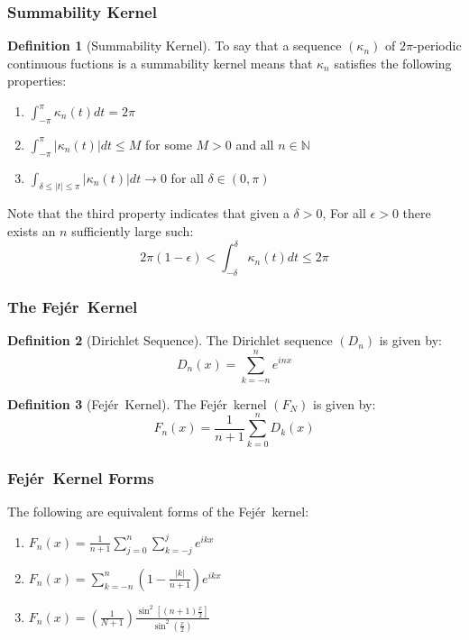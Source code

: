 \documentclass[xcolor=dvipsnames]{beamer}
\theoremstyle{definition}
\newtheorem*{defn}{Definition}
\newcommand{\N}{\mathbb{N}}
\providecommand{\abs}[1]{\left\lvert#1\right\rvert}        %
\newcommand{\Fej}{Fej\'{e}r\ }
\renewcommand{\d}{\delta}
\newcommand{\e}{\epsilon}
\renewcommand{\k}{\kappa}
\begin{document}
\begin{frame}
  \frametitle{Summability Kernel}

  \begin{defn}[Summability Kernel]
    To say that a sequence $(\k_n)$ of $2\pi$-periodic continuous fuctions is
      a summability kernel means that $\k_n$ satisfies the following properties:
      \begin{enumerate}
      \item $\int_{-\pi}^{\pi}\k_n(t)dt=2\pi$
      \item $\int_{-\pi}^{\pi}\abs{\k_n(t)}dt\le M$ for some $M>0$ and all
          $n\in\N$
      \item $\int_{\d\le\abs{t}\le\pi}\abs{\k_n(t)}dt\to0$ for all $\d\in(0,\pi)$
    \end{enumerate}
  \end{defn}

  Note that the third property indicates that given a $\d>0$, For all $\e>0$
  there exists an $n$ sufficiently large such:
  \[2\pi(1-\e)<\int_{-\d}^{\d}\k_n(t)dt\le2\pi\]
  
\end{frame}

\begin{frame}
  \frametitle{The \Fej Kernel}
  
  \begin{defn}[Dirichlet Sequence]
    The Dirichlet sequence $(D_n)$ is given by:
    \[D_n(x)=\sum_{k=-n}^ne^{inx}\]
  \end{defn}

  \begin{defn}[\Fej Kernel]
    The \Fej kernel $(F_N)$ is given by:
    \[F_n(x)=\frac{1}{n+1}\sum_{k=0}^nD_k(x)\]
  \end{defn}

\end{frame}

\begin{frame}
  \frametitle{\Fej Kernel Forms}
  
  \begin{theorem}
    The following are equivalent forms of the \Fej kernel:
    \begin{enumerate}
    \item $F_n(x)=\frac{1}{n+1}\sum_{j=0}^n\sum_{k=-j}^je^{ikx}$

    \item $F_n(x)=\sum_{k=-n}^n\left(1-\frac{\abs{k}}{n+1}\right)e^{ikx}$

    \item $F_n(x)=\left(\frac{1}{N+1}\right)
    \frac{\sin^2\left[(n+1)\frac{x}{2}\right]}{\sin^2\left(\frac{x}{2}\right)}$
    \end{enumerate}
  \end{theorem}

\end{frame}
\end{document}
